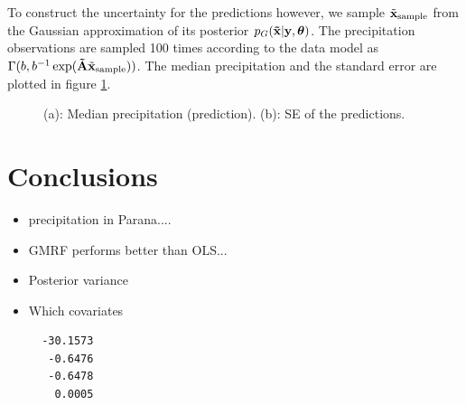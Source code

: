 \documentclass[a4paper,10pt]{article}
\def\btA{{\bf \tilde A}}
\def\bx{{\bf x}}
\def\by{{\bf y}}
\def\btx{{\bf{\tilde x}}}
\def\btheta{{\boldsymbol \theta}}
\def\txsample{{\tilde \bx_{\mathrm{sample}}}}
\begin{document}
To construct the uncertainty for the predictions however, we sample $\txsample$ from the Gaussian approximation of its posterior $p_G(\btx|\by, \btheta)$. The precipitation observations are sampled 100 times according to the data model as $\Gamma(b, b^{-1} \exp(\btA \txsample))$. The median precipitation and the standard error are plotted in figure \ref{fig:meshpred}.
\begin{figure}[ht]
\centering
  \qquad
  \caption{(a): Median precipitation (prediction). (b): SE of the predictions.}
\label{fig:meshpred}
\end{figure}
\section{Conclusions}
\begin{itemize}
 \item precipitation in Parana....
 \item GMRF performs better than OLS...
 \item Posterior variance
 \item Which covariates
 
 \begin{verbatim}
  -30.1573
   -0.6476
   -0.6478
    0.0005
 \end{verbatim}

\end{itemize}
\end{document}
